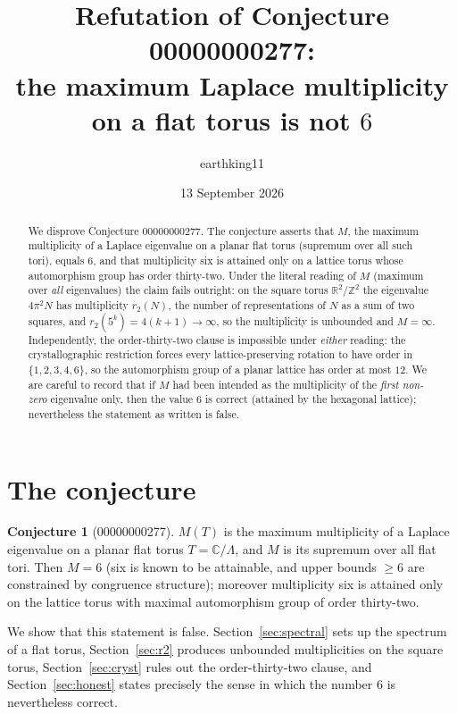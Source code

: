 \documentclass[11pt]{article}
\title{Refutation of Conjecture 00000000277:\\
the maximum Laplace multiplicity on a flat torus is not $6$}
\author{earthking11}
\date{13 September 2026}
\theoremstyle{definition}
\newtheorem{conjecture}[theorem]{Conjecture}
\theoremstyle{remark}
\newcommand{\R}{\mathbb{R}}
\newcommand{\Z}{\mathbb{Z}}
\newcommand{\C}{\mathbb{C}}
\newcommand{\Lam}{\Lambda}
\newcommand{\rtwo}{r_2}
\begin{document}
\maketitle

\begin{abstract}
We disprove Conjecture 00000000277.  The conjecture asserts that $M$, the
maximum multiplicity of a Laplace eigenvalue on a planar flat torus (supremum
over all such tori), equals $6$, and that multiplicity six is attained only on
a lattice torus whose automorphism group has order thirty-two.  Under the
literal reading of $M$ (maximum over \emph{all} eigenvalues) the claim fails
outright: on the square torus $\R^2/\Z^2$ the eigenvalue $4\pi^2 N$ has
multiplicity $\rtwo(N)$, the number of representations of $N$ as a sum of two
squares, and $\rtwo(5^k)=4(k+1)\to\infty$, so the multiplicity is unbounded and
$M=\infty$.  Independently, the order-thirty-two clause is impossible under
\emph{either} reading: the crystallographic restriction forces every
lattice-preserving rotation to have order in $\{1,2,3,4,6\}$, so the
automorphism group of a planar lattice has order at most $12$.  We are careful
to record that if $M$ had been intended as the multiplicity of the
\emph{first non-zero} eigenvalue only, then the value $6$ is correct (attained
by the hexagonal lattice); nevertheless the statement as written is false.
\end{abstract}

\section{The conjecture}

\begin{conjecture}[00000000277]
$M(T)$ is the maximum multiplicity of a Laplace eigenvalue on a planar flat
torus $T=\C/\Lam$, and $M$ is its supremum over all flat tori.  Then
$M=6$ (six is known to be attainable, and upper bounds $\ge 6$ are constrained
by congruence structure); moreover multiplicity six is attained only on the
lattice torus with maximal automorphism group of order thirty-two.
\end{conjecture}

We show that this statement is false.  Section~\ref{sec:spectral} sets up the
spectrum of a flat torus, Section~\ref{sec:r2} produces unbounded
multiplicities on the square torus, Section~\ref{sec:cryst} rules out the
order-thirty-two clause, and Section~\ref{sec:honest} states precisely the
sense in which the number $6$ is nevertheless correct.
\end{document}
